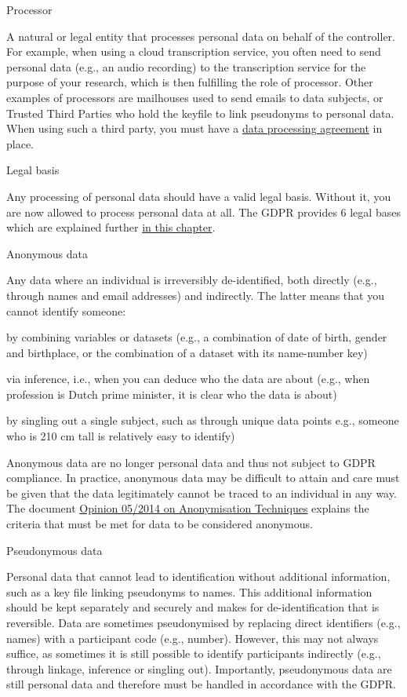 \documentclass[
]{book}
\begin{document}
Processor

A natural or legal entity that processes personal data on behalf of the
controller. For example, when using a cloud transcription service, you often
need to send personal data (e.g., an audio recording) to the transcription
service for the purpose of your research, which is then fulfilling the role
of processor. Other examples of processors are mailhouses used to send emails
to data subjects, or Trusted Third Parties who hold the keyfile to link
pseudonyms to personal data. When using such a third party, you must have a
\protect\hyperlink{data-processing-agreement}{data processing agreement} in place.

Legal basis

Any processing of personal data should have a valid legal basis. Without it,
you are now allowed to process personal data at all. The GDPR provides 6 legal
bases which are explained further \protect\hyperlink{legal-basis}{in this chapter}.

Anonymous data

Any data where an individual is irreversibly de-identified, both directly
(e.g., through names and email addresses) and indirectly. The latter means
that you cannot identify someone:

by combining variables or datasets (e.g., a combination of date of birth,
gender and birthplace, or the combination of a dataset with its name-number key)

via inference, i.e., when you can deduce who the data are about (e.g.,
when profession is Dutch prime minister, it is clear who the data is about)

by singling out a single subject, such as through unique data points
e.g., someone who is 210 cm tall is relatively easy to identify)

Anonymous data are no longer personal data and thus not subject to GDPR
compliance. In practice, anonymous data may be difficult to attain and care
must be given that the data legitimately cannot be traced to an individual in
any way. The document
\href{https://ec.europa.eu/justice/article-29/documentation/opinion-recommendation/files/2014/wp216_en.pdf}{Opinion 05/2014 on Anonymisation Techniques}
explains the criteria that must be met for data to be considered anonymous.

Pseudonymous data

Personal data that cannot lead to identification without additional
information, such as a key file linking pseudonyms to names. This additional
information should be kept separately and securely and makes for
de-identification that is reversible. Data are sometimes pseudonymised by
replacing direct identifiers (e.g., names) with a participant code (e.g.,
number). However, this may not always suffice, as sometimes it is still
possible to identify participants indirectly (e.g., through linkage, inference
or singling out). Importantly, pseudonymous data are still personal data and
therefore must be handled in accordance with the GDPR.
\end{document}
